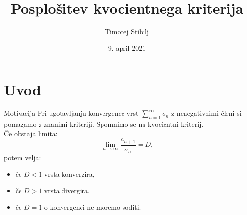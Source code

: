 \documentclass{beamer}
\begin{document}
\title{Posplošitev kvocientnega kriterija}
\author{Timotej Stibilj}
\date{9. april 2021}

\begin{frame}
   \titlepage
\end{frame}
\section{Uvod}
\begin{frame}
    \begin{block}{Motivacija}
    Pri ugotavljanju konvergence vrst $\sum_{n = 1}^{\infty}{a_n}$ z nenegativnimi členi si pomagamo z znanimi kriteriji.
    Spomnimo se na kvocientni kriterij. \\
    \pause
    Če obstaja limita:
    \[
       \lim_{n \to \infty} \frac{a_{n + 1}}{a_n} = D \text{,}
    \]
    potem velja: \\
         \begin{itemize}
             \item če $ D < 1 $ vrsta konvergira,
             \item če $ D > 1$ vrsta divergira,
             \item če $ D = 1$ o konvergenci ne moremo soditi.
         \end{itemize}
   
    \end{block}
\end{frame}
\end{document}

